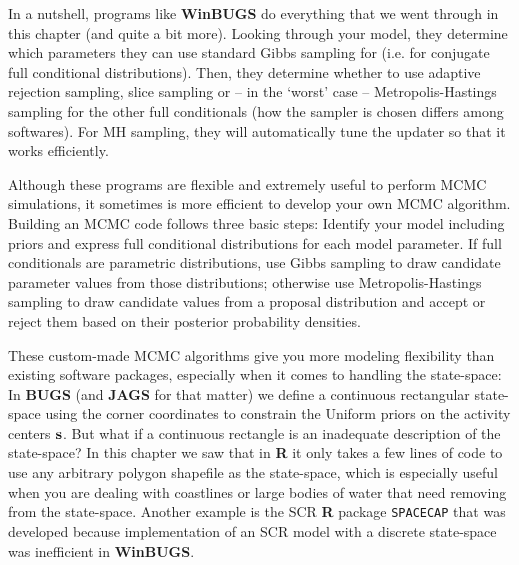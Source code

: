 In a nutshell, programs like {\bf WinBUGS} do everything that we
went through in this chapter (and quite a bit more). Looking through
your model, they determine which parameters they can use standard
Gibbs sampling for (i.e. for conjugate full conditional distributions).
Then, they determine whether to use adaptive
rejection sampling, slice sampling or -- in the `worst' case --
Metropolis-Hastings sampling for the other full conditionals (how the sampler is chosen differs among softwares). For MH sampling, they will
automatically tune the updater so that it works efficiently.

Although these programs are flexible and extremely useful to perform MCMC simulations, it sometimes is more efficient to
develop your own MCMC algorithm. Building an MCMC code follows three basic
steps: Identify your model including priors and express full conditional
distributions for each model parameter. If full conditionals are parametric
distributions, use Gibbs sampling to draw candidate parameter values from
those distributions; otherwise use Metropolis-Hastings sampling to draw
candidate values from a proposal distribution and accept or reject them
based on their posterior probability densities.

These custom-made MCMC algorithms give you more modeling flexibility than
existing software packages, especially when it comes to handling the
 state-space: In {\bf BUGS} (and {\bf JAGS} for that matter) we define
  a continuous rectangular state-space using the corner coordinates to
  constrain the Uniform priors on the activity centers ${\bf s}$.
   But what if a continuous rectangle is an inadequate description of
   the state-space? In this chapter we saw that in {\bf R} it only takes
   a few lines of code to use any arbitrary polygon shapefile as the
   state-space, which is especially useful when you are dealing with
   coastlines or large bodies of water that need removing from the
   state-space. Another example is the SCR {\bf R} package \mbox{\tt SPACECAP}
    \citep{gopalaswamy_etal:2012mee} that was developed because implementation
     of an SCR model with a discrete state-space was inefficient in {\bf WinBUGS}.

